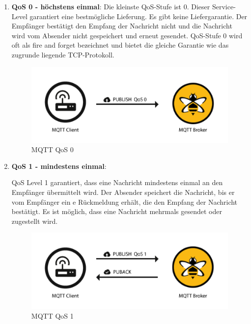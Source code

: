 \begin{enumerate}
    \item \textbf{QoS 0 - höchstens einmal}:
    Die kleinste QoS-Stufe ist 0. Dieser Service-Level garantiert eine bestmögliche Lieferung. Es gibt keine Liefergarantie. Der Empfänger bestätigt den Empfang der Nachricht nicht und die Nachricht wird vom Absender nicht gespeichert und erneut gesendet. QoS-Stufe 0 wird oft als \glqq fire and forget\grqq{} bezeichnet und bietet die gleiche Garantie wie das zugrunde liegende TCP-Protokoll. 

    \begin{figure}[H]
        \begin{center}
            \includegraphics[scale=0.8]{images/QoS-0.png}
            \caption{MQTT QoS 0 \cite{hivemq}}
        \end{center}
    \end{figure}

    \item \textbf{QoS 1 - mindestens einmal}:
    
    QoS Level 1 garantiert, dass eine Nachricht mindestens einmal an den Empfänger übermittelt wird. Der Absender speichert die Nachricht, bis er vom Empfänger ein e Rückmeldung erhält, die den Empfang der Nachricht bestätigt. Es ist möglich, dass eine Nachricht mehrmals gesendet oder zugestellt wird.

    \begin{figure}[H]
        \begin{center}
            \includegraphics[scale=0.8]{images/QoS-1.png}
            \caption{MQTT QoS 1 \cite{hivemq}}
        \end{center}
    \end{figure}


\end{enumerate}
